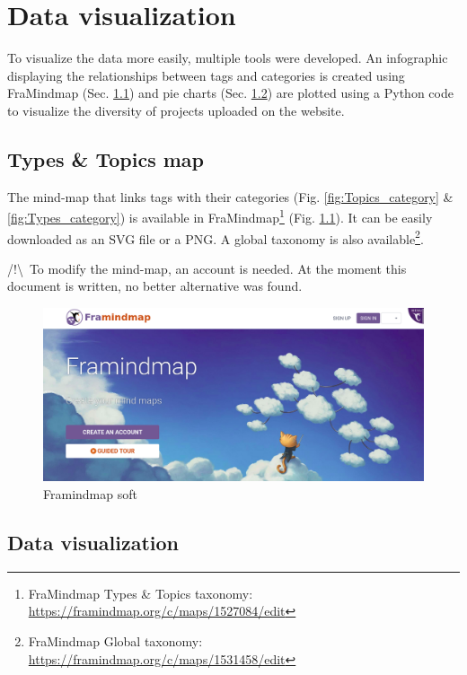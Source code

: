 \chapter{Data visualization}\label{chap:data}

To visualize the data more easily, multiple tools were developed. An infographic displaying the relationships between tags and categories is created using FraMindmap (Sec. \ref{sec:map}) and pie charts (Sec. \ref{sec:camembert}) are plotted using a Python code to visualize the diversity of projects uploaded on the website. 

\section{Types \& Topics map}\label{sec:map}

The mind-map that links tags with their categories (Fig. \ref{fig:Topics_category} \& \ref{fig:Types_category}) is available in FraMindmap\footnote{FraMindmap Types \& Topics taxonomy: \href{https://framindmap.org/c/maps/1527084/edit}{https://framindmap.org/c/maps/1527084/edit}} (Fig. \ref{fig:framamindmap}). It can be easily downloaded as an SVG file or a PNG. A global taxonomy is also available\footnote{FraMindmap Global taxonomy: \href{https://framindmap.org/c/maps/1531458/edit}{https://framindmap.org/c/maps/1531458/edit}}.

/!\textbackslash \ To modify the mind-map, an account is needed. At the moment this document is written, no better alternative was found.

\begin{figure}[h!]
    \centering
    \includegraphics[width=\linewidth]{Image/Data visualization/framamindmap.png}
    \caption{Framindmap soft}
    \label{fig:framamindmap}
\end{figure}

\newpage
\section{Data visualization}\label{sec:camembert}

